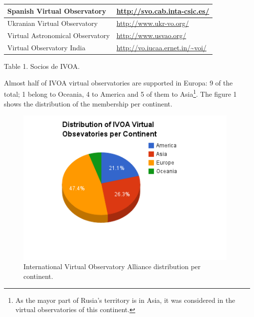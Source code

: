 \documentclass[11pt]{article}
\begin{document}
\begin{center}
\begin{tabular}{|p{7cm} | p{7cm}|}
                     \hline
                     Spanish Virtual Observatory &
\url{http://svo.cab.inta-csic.es/} \\
                     \hline
                     Ukranian Virtual Observatory & \url{http://www.ukr-vo.org/}
\\
                     \hline
                     Virtual Astronomical Observatory &
\url{http://www.usvao.org/} \\
                     \hline
                     Virtual Observatory India &
\url{http://vo.iucaa.ernet.in/~voi/} \\
                     \hline
                 \end{tabular}
        
             Table 1. Socios de IVOA.
             \end{center}

             Almost half of IVOA virtual observatories are supported in Europa:
9 of the total; 1 belong to Oceania, 4 to America and 5 of them to
Asia\footnote{As the mayor part of Rusia's territory is in Asia, it was
considered in the virtual observatories of this continent.}. The figure 1 shows
the distribution of the membership per continent.\\

             \begin{figure}[h]
                  \begin{center}
                      \includegraphics[width=110mm]
{IVOA_VOs_distribution_per_continent_by_JDMT.png}
                      \caption{International Virtual Observatory Alliance
distribution per continent.}
                  \end{center}
             \end{figure}
            
\end{document}
